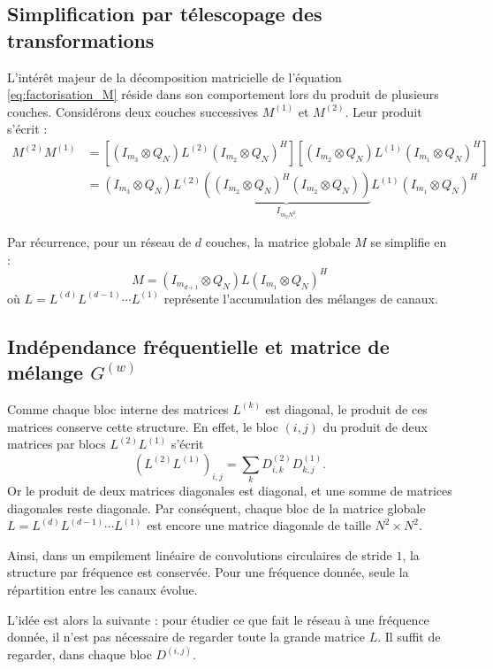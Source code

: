 \subsection{Simplification par télescopage des transformations}

L'intérêt majeur de la décomposition matricielle de l'équation \eqref{eq:factorisation_M} réside 
dans son comportement lors du produit de plusieurs couches. Considérons deux couches 
successives $M^{(1)}$ et $M^{(2)}$. Leur produit s'écrit :
\begin{align*}
M^{(2)}M^{(1)} &= \left[ (I_{m_3} \otimes Q_N) L^{(2)} (I_{m_2} \otimes Q_N)^H \right] \left[ (I_{m_2} \otimes Q_N) L^{(1)} (I_{m_1} \otimes Q_N)^H \right] \\
&= (I_{m_3} \otimes Q_N) L^{(2)} \underbrace{\left( (I_{m_2} \otimes Q_N)^H (I_{m_2} \otimes Q_N) \right)}_{I_{m_2 N^2}} L^{(1)} (I_{m_1} \otimes Q_N)^H
\end{align*}

Par récurrence, pour un réseau de $d$ couches, la matrice globale $M$ se simplifie en :
\[
M = (I_{m_{d+1}} \otimes Q_N) L (I_{m_1} \otimes Q_N)^H
\]
où $L = L^{(d)} L^{(d-1)} \cdots L^{(1)}$ représente l'accumulation des mélanges de canaux.

\subsection{Indépendance fréquentielle et matrice de mélange $G^{(w)}$}

Comme chaque bloc interne des matrices $L^{(k)}$ est diagonal, le produit de ces matrices conserve cette structure.
En effet, le bloc $(i,j)$ du produit de deux matrices par blocs $L^{(2)}L^{(1)}$ s'écrit
\[
(L^{(2)}L^{(1)})_{i,j}
=
\sum_k D^{(2)}_{i,k}D^{(1)}_{k,j}.
\] 
Or le produit de deux matrices diagonales est diagonal, et une somme de matrices diagonales reste diagonale.
Par conséquent, chaque bloc de la matrice globale $L = L^{(d)}L^{(d-1)}\cdots L^{(1)}$ est encore une matrice diagonale de taille $N^2 \times N^2$.

Ainsi, dans un empilement linéaire de convolutions circulaires de stride $1$, la structure par fréquence
est conservée. Pour une fréquence donnée, seule la répartition entre les canaux évolue.

L'idée est alors la suivante : pour étudier ce que fait le réseau à une fréquence donnée, il n'est pas
nécessaire de regarder toute la grande matrice $L$. Il suffit de regarder, dans chaque bloc
$D^{(i,j)}$.

